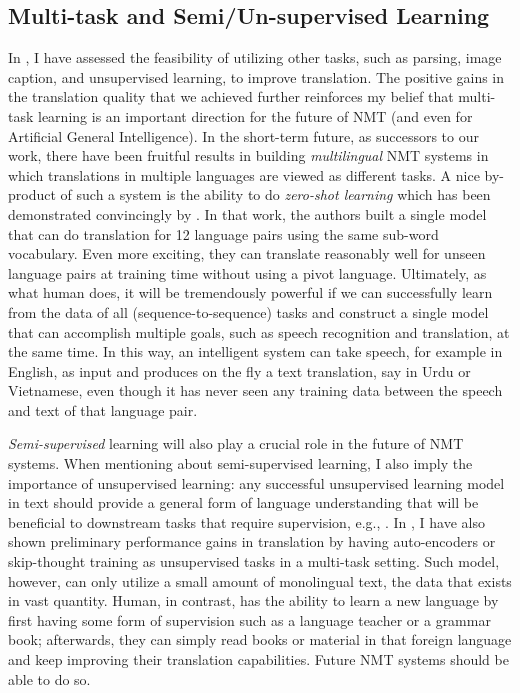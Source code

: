 \subsection{Multi-task and Semi/Un-supervised Learning}
In , I have assessed the feasibility of utilizing other tasks, such as parsing, image caption, and unsupervised learning, to improve translation. The positive gains in the translation quality that we achieved further reinforces my belief that multi-task learning is an important direction for the future of NMT (and even for Artificial General Intelligence). In the short-term future, as successors to our work, there have been fruitful results in building {\it multilingual} NMT systems \cite{zoph16,firat16,gnmt16multi,ha16} in which translations in multiple languages are viewed as different tasks. A nice by-product of such a system is the ability to do {\it zero-shot learning} which has been demonstrated convincingly by . In that work, the authors built a single model that can do translation for 12 language pairs using the same sub-word vocabulary. Even more exciting, they can translate reasonably well for unseen language pairs at training time without using a pivot language. Ultimately, as what human does, it will be tremendously powerful if we can successfully learn from the data of all (sequence-to-sequence) tasks and construct a single model that can accomplish multiple goals, such as speech recognition and translation, at the same time. In this way, an intelligent system can take speech, for example in English, as input and produces on the fly a text translation, say in Urdu or Vietnamese, even though it has never seen any training data between the speech and text of that language pair.

{\it Semi-supervised} learning will also play a crucial role in the future of NMT systems. When mentioning about semi-supervised learning, I also imply the importance of unsupervised learning: any successful unsupervised learning model in text should provide a general form of language understanding that will be beneficial to downstream tasks that require supervision, e.g., \cite{dai15}.
In , I have also shown preliminary performance gains in translation by having auto-encoders or skip-thought training as unsupervised tasks in a multi-task setting. Such model, however, can only utilize a small amount of monolingual text, the data that exists in vast quantity. Human, in contrast, has the ability to learn a new language by first having some form of supervision such as a language teacher or a grammar book; afterwards, they can simply read books or material in that foreign language and keep improving their translation capabilities. Future NMT systems should be able to do so. 


